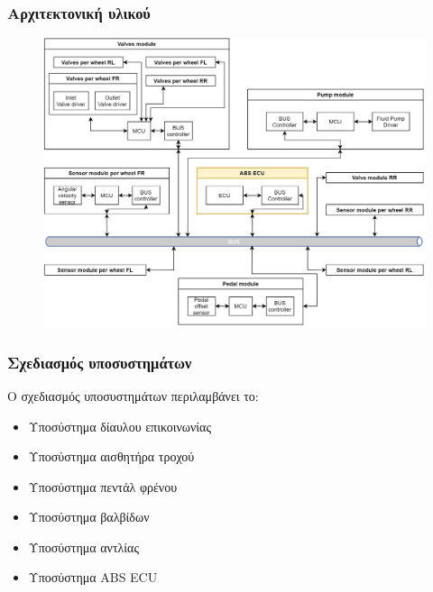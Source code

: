 \documentclass[fleqn]{beamer}
\begin{document}
\begin{frame}
  \frametitle{Αρχιτεκτονική υλικού}
  \begin{figure}[h]
    \begin{center}
    \includegraphics[scale=0.17]{images/hardware-architecture.png}
    \end{center}
\end{figure}
\end{frame}

\begin{frame}
  \frametitle{Σχεδιασμός υποσυστημάτων}
  Ο σχεδιασμός υποσυστημάτων περιλαμβάνει το:
  \begin{itemize}
    \item Υποσύστημα δίαυλου επικοινωνίας
    \item Υποσύστημα αισθητήρα τροχού
    \item Υποσύστημα πεντάλ φρένου
    \item Υποσύστημα βαλβίδων
    \item Υποσύστημα αντλίας
    \item Υποσύστημα ABS ECU
  \end{itemize}
\end{frame}
\end{document}
